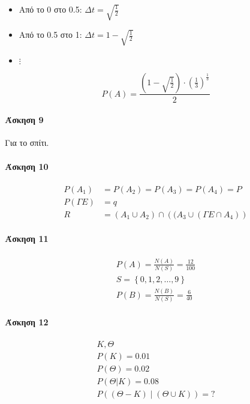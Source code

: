 \documentclass[11pt,a4paper,titlepage,draft]{article}
\begin{document}
\begin{itemize}
\item Από το 0 στο 0.5: \(\Delta t = \sqrt{\frac{1}{2}} \)
\item Από το 0.5 στο 1: \(\Delta t = 1-\sqrt{\frac{1}{2}} \)
\item \(\vdots\)
\end{itemize}

\[
P(A)=\frac{(1-\sqrt{\frac{1}{2}})\cdot\left( \frac{1}{3} \right)^\frac{1}{3}}{2}
\]

\paragraph{Άσκηση 9}
Για το σπίτι.

\paragraph{Άσκηση 10}

\begin{align*}
P(A_1)&=P(A_2)=P(A_3)=P(A_4)=P \\
P( \Gamma E) &= q \\
R &= (A_1 \cup A_2) \cap \left( (A_3 \cup (  \Gamma E \cap A_4)  \right)
\end{align*}

\paragraph{Άσκηση 11}
\begin{gather*}
P(A) = \frac{N(A)}{N(S)} = \frac{12}{100} \\
S =  \left\lbrace 0,1,2,\dots,9 \right\rbrace \\
P(B) = \frac{N(B)}{N(S)} = \frac{6}{40}
\end{gather*}

\paragraph{Άσκηση 12}
\begin{gather*}
K, \Theta\\
P(K) = 0.01 \\
P(\Theta) = 0.02 \\
P(\Theta | K) = 0.08 \\
P \left(  (\Theta - K) \middle| (\Theta \cup K) \right) = ?
\end{gather*}
\end{document}
